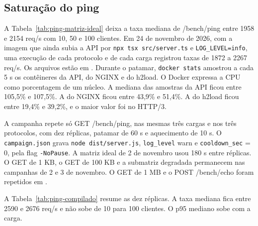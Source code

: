 \subsection{Saturação do ping}\label{sec:ping-saturacao}

A Tabela~\ref{tab:ping-matriz-ideal} deixa a taxa mediana de /bench/ping entre 1958 e 2154 req/s com 10, 50 e 100 clientes. Em 24 de novembro de 2026, com a imagem que ainda subia a API por \texttt{npx tsx src/server.ts} e \texttt{LOG\_LEVEL=info}, uma execução de cada protocolo e de cada carga registrou taxas de 1872 a 2267 req/s. Os arquivos estão em . Durante o patamar, \texttt{docker stats} amostrou a cada 5 s os contêineres da API, do NGINX e do h2load. O Docker expressa a CPU como porcentagem de um núcleo. A mediana das amostras da API ficou entre 105,5\% e 107,5\%. A do NGINX ficou entre 43,9\% e 51,4\%. A do h2load ficou entre 19,4\% e 39,2\%, e o maior valor foi no HTTP/3.

A campanha  repete só GET /bench/ping, nas mesmas três cargas e nos três protocolos, com dez réplicas, patamar de 60 s e aquecimento de 10 s. O \texttt{campaign.json} grava \texttt{node dist/server.js}, \texttt{log\_level} warn e \texttt{cooldown\_sec} = 0, pela flag \texttt{-NoPause}. A matriz ideal de 2 de novembro usou 180 s entre réplicas. O GET de 1 KB, o GET de 100 KB e a submatriz degradada permanecem nas campanhas de 2 e 3 de novembro. O GET de 1 MB e o POST /bench/echo foram repetidos em .

A Tabela~\ref{tab:ping-compilado} resume as dez réplicas. A taxa mediana fica entre 2590 e 2676 req/s e não sobe de 10 para 100 clientes. O p95 mediano sobe com a carga.

